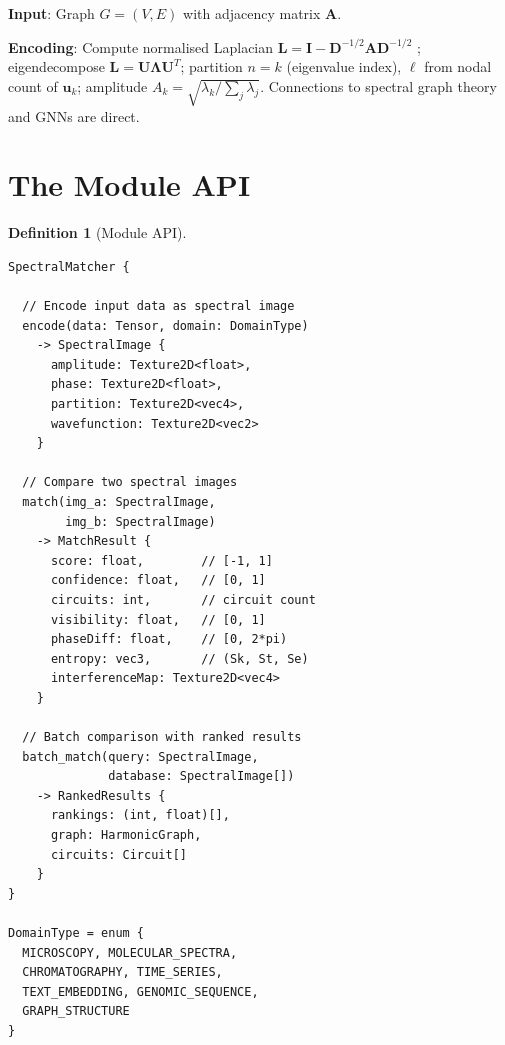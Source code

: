 \documentclass[11pt,twocolumn,a4paper]{article}
\newtheorem{definition}[theorem]{Definition}
\begin{document}
\textbf{Input}: Graph $G = (V, E)$ with adjacency matrix $\mathbf{A}$.

\textbf{Encoding}: Compute normalised Laplacian
$\mathbf{L} = \mathbf{I} - \mathbf{D}^{-1/2}\mathbf{A}\mathbf{D}^{-1/2}$
\citep{chung1997}; eigendecompose
$\mathbf{L} = \mathbf{U\Lambda U}^T$; partition $n = k$
(eigenvalue index), $\ell$ from nodal count of $\mathbf{u}_k$; amplitude
$A_k = \sqrt{\lambda_k / \sum_j \lambda_j}$. Connections to spectral
graph theory \citep{chung1997} and GNNs \citep{kipf2017} are direct.



\section{The Module API}
\label{sec:module_api}

\begin{definition}[Module API]
\label{def:api}
\begin{lstlisting}[style=api]
SpectralMatcher {

  // Encode input data as spectral image
  encode(data: Tensor, domain: DomainType)
    -> SpectralImage {
      amplitude: Texture2D<float>,
      phase: Texture2D<float>,
      partition: Texture2D<vec4>,
      wavefunction: Texture2D<vec2>
    }

  // Compare two spectral images
  match(img_a: SpectralImage,
        img_b: SpectralImage)
    -> MatchResult {
      score: float,        // [-1, 1]
      confidence: float,   // [0, 1]
      circuits: int,       // circuit count
      visibility: float,   // [0, 1]
      phaseDiff: float,    // [0, 2*pi)
      entropy: vec3,       // (Sk, St, Se)
      interferenceMap: Texture2D<vec4>
    }

  // Batch comparison with ranked results
  batch_match(query: SpectralImage,
              database: SpectralImage[])
    -> RankedResults {
      rankings: (int, float)[],
      graph: HarmonicGraph,
      circuits: Circuit[]
    }
}

DomainType = enum {
  MICROSCOPY, MOLECULAR_SPECTRA,
  CHROMATOGRAPHY, TIME_SERIES,
  TEXT_EMBEDDING, GENOMIC_SEQUENCE,
  GRAPH_STRUCTURE
}
\end{lstlisting}
\end{definition}
\end{document}

